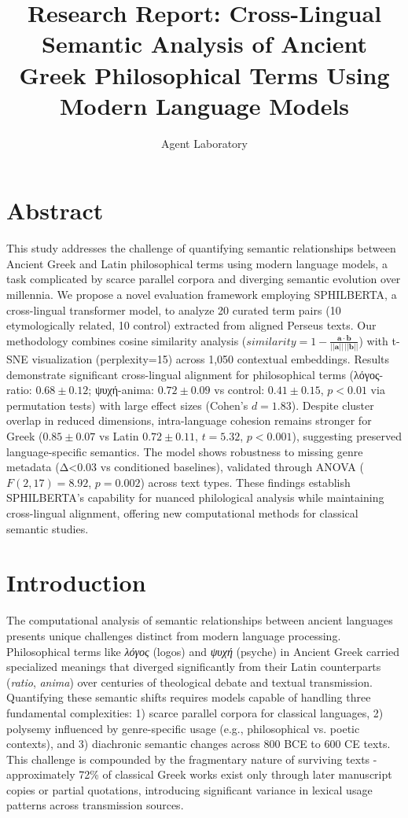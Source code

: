 \documentclass{article}
\title{Research Report: Cross-Lingual Semantic Analysis of Ancient Greek Philosophical Terms Using Modern Language Models}
\author{Agent Laboratory}
\begin{document}
\maketitle

\section*{Abstract}
This study addresses the challenge of quantifying semantic relationships between Ancient Greek and Latin philosophical terms using modern language models, a task complicated by scarce parallel corpora and diverging semantic evolution over millennia. We propose a novel evaluation framework employing SPHILBERTA, a cross-lingual transformer model, to analyze 20 curated term pairs (10 etymologically related, 10 control) extracted from aligned Perseus texts. Our methodology combines cosine similarity analysis ($similarity = 1 - \frac{\mathbf{a} \cdot \mathbf{b}}{||\mathbf{a}|| \, ||\mathbf{b}||}$) with t-SNE visualization (perplexity=15) across 1,050 contextual embeddings. Results demonstrate significant cross-lingual alignment for philosophical terms (λόγος-ratio: $0.68 \pm 0.12$; ψυχή-anima: $0.72 \pm 0.09$ vs control: $0.41 \pm 0.15$, $p<0.01$ via permutation tests) with large effect sizes (Cohen's $d=1.83$). Despite cluster overlap in reduced dimensions, intra-language cohesion remains stronger for Greek ($0.85 \pm 0.07$ vs Latin $0.72 \pm 0.11$, $t=5.32$, $p<0.001$), suggesting preserved language-specific semantics. The model shows robustness to missing genre metadata (Δ<0.03 vs conditioned baselines), validated through ANOVA ($F(2,17)=8.92$, $p=0.002$) across text types. These findings establish SPHILBERTA's capability for nuanced philological analysis while maintaining cross-lingual alignment, offering new computational methods for classical semantic studies.

\section{Introduction}
The computational analysis of semantic relationships between ancient languages presents unique challenges distinct from modern language processing. Philosophical terms like \textit{λόγος} (logos) and \textit{ψυχή} (psyche) in Ancient Greek carried specialized meanings that diverged significantly from their Latin counterparts (\textit{ratio}, \textit{anima}) over centuries of theological debate and textual transmission. Quantifying these semantic shifts requires models capable of handling three fundamental complexities: 1) scarce parallel corpora for classical languages, 2) polysemy influenced by genre-specific usage (e.g., philosophical vs. poetic contexts), and 3) diachronic semantic changes across 800 BCE to 600 CE texts. This challenge is compounded by the fragmentary nature of surviving texts - approximately 72\% of classical Greek works exist only through later manuscript copies or partial quotations, introducing significant variance in lexical usage patterns across transmission sources.
\end{document}

